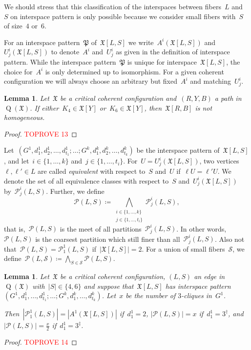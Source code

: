 \documentclass[english,a4paper]{article}
\theoremstyle{plain}
\newtheorem{lemma}      [theorem]{Lemma}
\theoremstyle{definition}
\newcommand{\abs}[1]{| #1 |}
\newcommand{\coherentConfig}{\ensuremath{\mathfrak{X}}}
\newcommand{\interspace}[2]{\ensuremath{\coherentConfig[#1,#2]}}
\newcommand{\inducedCC}[1]{\ensuremath{\coherentConfig[#1]}}
\DeclareMathOperator*{\Quotient}{Q}
\newcommand{\quotientGraph}[1]{\ensuremath{\Quotient(#1)}}
\newcommand{\partition}[1]{\ensuremath{\mathcal{P}^1_1(#1)}}
\newcommand{\partitionRel}[3]{\ensuremath{\mathcal{P}^{#1}_{#2}(#3)}}
\newcommand{\equivalenceClasses}[1]{\ensuremath{\mathcal{P}(#1)}}
\newcommand{\clique}[1]{\ensuremath{K_{#1}}}
\begin{document}
We should stress that this classification of the interspaces between fibers~$L$ and~$S$ on interspace pattern is only possible because we consider small fibers with~$S$ of size~$4$ or~$6$.


For an interspace pattern~$\mathfrak{P}$ of~$\interspace{L}{S}$ we write~$A^i(\interspace{L}{S})$ and~$U^i_j(\interspace{L}{S})$ to denote~$A^i$ and~$U^i_j$ as given in the definition of interspace pattern. While the interspace pattern~$\mathfrak{P}$ is unique for interspace~$\interspace{L}{S}$, the choice for~$A^i$ is only determined up to isomorphism. For a given coherent configuration we will always choose an arbitrary but fixed~$A^i$ and matching~$U^i_j$.


\begin{lemma}
\label{global-argument:k4-exclusion/lem}
    Let~$\coherentConfig$ be a critical coherent configuration and~$(R,Y,B)$ a path in~$\quotientGraph{\coherentConfig}$.
    If either~$\clique{4} \in \inducedCC{Y}$ or~$\clique{6} \in \inducedCC{Y}$, then~$\interspace{R}{B}$ is not homogeneous.
\end{lemma}
\begin{proof}\textcolor{red}{TOPROVE 13}\end{proof}


Let~$(G^1, d^1_1, d^1_2, \dots, d^1_{t_1}; \dots; G^k, d^k_1, d^k_2, \dots, d^k_{t_k})$ be the interspace pattern of~$\interspace{L}{S}$, and let~$i \in \{1,\ldots,k\}$ and~$j \in \{1,\ldots,t_i\}$.
For~$U = U^i_j(\interspace{L}{S})$, two vertices~$\ell, \ell' \in L$ are called \emph{equivalent} with respect to~$S$ and~$U$ if~$\ell U =\ell'U$.
We denote the set of all equivalence classes with respect to~$S$ and~$U^i_j(\interspace{L}{S})$ by~$\partitionRel{i}{j}{L,S}$.
Further, we define~
\[
    \equivalenceClasses{L,S} \coloneqq \bigwedge_{\substack{i \in \{1,\ldots,k\} \\ j \in \{1,\ldots,t_i\}}}  \partitionRel{i}{j}{L,S},
\]
that is,~$\equivalenceClasses{L,S}$ is  the meet of all partitions~$\partitionRel{i}{j}{L,S}$.
In other words,~$\equivalenceClasses{L,S}$ is the coarsest partition which still finer than all~$\partitionRel{i}{j}{L,S}$. Also not that~$\equivalenceClasses{L,S} = \partition{L,S}$ if~$|\interspace{L}{S}|=2$.
For a union of small fibers~$\mathcal{S}$, we define~$\equivalenceClasses{L,\mathcal{S}} \coloneqq \bigwedge_{S \in \mathcal{S}} \equivalenceClasses{L,S}$.


\begin{lemma}
\label{interspace-pattern:partition-size/lem}
    Let~$\coherentConfig$ be a critical coherent configuration, $(L,S)$ an edge in~$\quotientGraph{\coherentConfig}$ with~$|S|\in \{4,6\}$ and suppose that~$\interspace{L}{S}$ has interspace pattern~$(G^1, d^1_1, \dots, d^1_{t_1}; \dots; G^k, d^k_1, \dots, d^k_{t_k})$.
    Let~$x$ be the number of $3$-cliques in~$G^1$.

    Then~$\abs{\partition{L,S}} = \abs{A^1(\interspace{L}{S})}$ if~$d^1_1 = 2$, $\abs{\equivalenceClasses{L,S}} = x$ if~$d^1_1 = 3^\dag$, and~$\abs{\equivalenceClasses{L,S}} = \frac{x}{2}$ if~$d^1_1 = 3^\ddag$.
\end{lemma}
\begin{proof}\textcolor{red}{TOPROVE 14}\end{proof}
\end{document}
